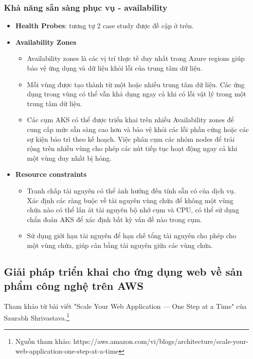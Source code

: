\subsubsection{Khả năng sẵn sàng phục vụ - availability}
    \begin{itemize}
        \item \textbf{Health Probes}: tương tự 2 case study được đề cập ở trên.
        \item \textbf{Availability Zones}
            \begin{itemize}
                \item Availability zones là các vị trí thực tế duy nhất trong  Azure regions giúp bảo vệ ứng dụng và dữ liệu khỏi lỗi của trung tâm dữ liệu. 
                \item Mỗi vùng được tạo thành từ một hoặc nhiều trung tâm dữ liệu. Các ứng dụng trong vùng có thể vẫn khả dụng ngay cả khi có lỗi vật lý trong một trung tâm dữ liệu. 
                \item Các cụm AKS có thể được triển khai trên nhiều Availability zones để cung cấp mức sẵn sàng cao hơn và bảo vệ khỏi các lỗi phần cứng hoặc các sự kiện bảo trì theo kế hoạch. Việc phân cụm các nhóm nodes để trải rộng trên nhiều vùng cho phép các nút tiếp tục hoạt động ngay cả khi một vùng duy nhất bị hỏng.  
            \end{itemize}
        \item \textbf{Resource constraints}
            \begin{itemize}
                \item Tranh chấp tài nguyên có thể ảnh hưởng đến tính sẵn có của dịch vụ. Xác định các ràng buộc về tài nguyên vùng chứa để không một vùng chứa nào có thể lấn át tài nguyên bộ nhớ cụm và CPU, có thể sử dụng chẩn đoán AKS để xác định bất kỳ vấn đề nào trong cụm.
                \item Sử dụng giới hạn tài nguyên để hạn chế tổng tài nguyên cho phép cho một vùng chứa, giúp cân bằng tài nguyên giữa các vùng chứa. 
            \end{itemize}
    \end{itemize}
\newpage
\subsection{Giải pháp triển khai cho ứng dụng web về sản phẩm công nghệ trên AWS}
\noindent Tham khảo từ bài viết "Scale Your Web Application — One Step at a Time" của Saurabh Shrivastava.\footnote{Nguồn tham khảo: https://aws.amazon.com/vi/blogs/architecture/scale-your-web-application-one-step-at-a-time}

